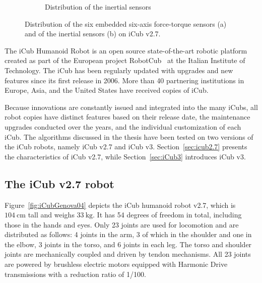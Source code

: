 \begin{figure}[tpb]
\begin{subfigure}[b]{0.48\textwidth}
        \caption{Distribution of the inertial sensors}
        \label{fig:iCubGenova04_imu}
    \end{subfigure}
    \caption[FT and IMU distribution on iCub v2.7]{Distribution of the six embedded six-axis force-torque sensors (a) and of the inertial sensors (b) on iCub v2.7.}
	\label{fig:iCubGenova04_sensors}
\end{figure}

The iCub Humanoid Robot is an open source state-of-the-art robotic platform created as part of the European project RobotCub~\citep{Tsagarakis2007,Natale2017,Parmiggiani2012,Metta2010} at the Italian Institute of Technology.
The iCub has been regularly updated with upgrades and new features since its first release in 2006. More than 40 partnering institutions in Europe, Asia, and the United States have received copies of iCub. 

Because innovations are constantly issued and integrated into the many iCubs, all robot copies have distinct features based on their release date, the maintenance upgrades conducted over the years, and the individual customization of each iCub. The algorithms discussed in the thesis have been tested on two versions of the iCub robots, namely iCub v2.7 and iCub v3. Section~\ref{sec:icub2.7} presents the characteristics of iCub v2.7, while Section~\ref{sec:iCub3} introduces iCub v3. 

\subsection{The iCub v2.7 robot\label{sec:icub2.7}}

Figure~\ref{fig:iCubGenova04} depicts the iCub humanoid robot v2.7, which is $\SI{104}{\centi\meter}$ tall and weighs $\SI{33}{\kilo\gram}$. It has 54 degrees of freedom in total, including those in the hands and eyes. Only 23 joints are used for locomotion and are distributed as follows: 4 joints in the arm, 3 of which in the shoulder and one in the elbow, 3 joints in the torso, and 6 joints in each leg. 
The torso and shoulder joints are mechanically coupled and driven by tendon mechanisms. All 23 joints are powered by brushless electric motors equipped with Harmonic Drive transmissions with a reduction ratio of 1/100.

